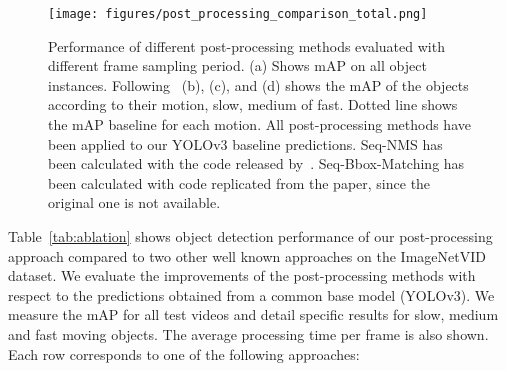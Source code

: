\documentclass[letterpaper, 10 pt, conference]{ieeeconf}
\begin{document}
\begin{figure*}[!tb]
\centering
\texttt{[image: figures/post\_processing\_comparison\_total.png]}
\caption{Performance of different post-processing methods evaluated with different frame sampling period. (a) Shows mAP on all object instances. Following~\cite{Zhu_2017_ICCV} (b), (c), and (d) shows the mAP of the objects according to their motion, slow, medium of fast. Dotted line shows the mAP baseline for each motion. All post-processing methods have been applied to our YOLOv3 baseline predictions. 
Seq-NMS has been calculated with the code released by~\cite{Zhu_2017_ICCV}.
Seq-Bbox-Matching has been calculated with code replicated from the paper, since the original one is not available.}
\label{fig:sparse}
\end{figure*}





 Table~\ref{tab:ablation} shows object detection performance of our post-processing approach compared to two other well known approaches on the ImageNetVID dataset. We evaluate the improvements of the post-processing methods with respect to the predictions obtained from a common base model (YOLOv3). We measure the mAP for all test videos and detail specific results for slow, medium and fast moving objects.  The average processing time per frame is also shown. Each row corresponds to one of the following approaches:
\end{document}
